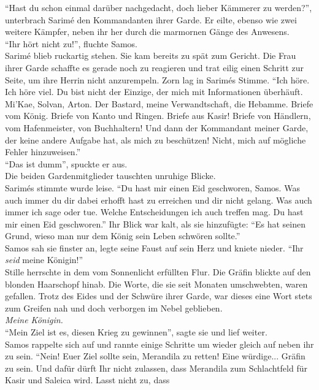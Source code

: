 ``Hast du schon einmal darüber nachgedacht, doch lieber Kämmerer zu werden?'', unterbrach Sarimé 
den Kommandanten ihrer Garde. Er eilte, ebenso wie zwei weitere Kämpfer, neben ihr her durch die 
marmornen Gänge des Anwesens.\\
``Ihr hört nicht zu!'', fluchte Samos.\\
Sarimé blieb ruckartig stehen. Sie kam bereits zu spät zum Gericht. Die Frau ihrer Garde schaffte 
es gerade noch zu reagieren und trat eilig einen Schritt zur Seite, um ihre Herrin nicht anzurempeln. 
Zorn lag in Sarimés Stimme. ``Ich höre. Ich höre viel. Du bist nicht der Einzige, der mich mit 
Informationen überhäuft. Mi'Kae, Solvan, Arton. Der Bastard, meine Verwandtschaft, die Hebamme. 
Briefe vom König. Briefe von Kanto und Ringen. Briefe aus Kasir! Briefe von Händlern, vom 
Hafenmeister, von Buchhaltern! Und dann der Kommandant meiner Garde, der keine andere Aufgabe hat, 
als mich zu beschützen! Nicht, mich auf mögliche Fehler hinzuweisen.''\\
``Das ist dumm'', spuckte er aus.\\
Die beiden Gardenmitglieder tauschten unruhige Blicke.\\
Sarimés stimmte wurde leise. ``Du hast mir einen Eid geschworen, Samos. Was auch immer du dir dabei 
erhofft hast zu erreichen und dir nicht gelang. Was auch immer ich sage oder tue. Welche 
Entscheidungen ich auch treffen mag. Du hast mir einen Eid geschworen.'' Ihr Blick war kalt, als 
sie hinzufügte: ``Es hat seinen Grund, wieso man nur dem König sein Leben schwören sollte.''\\
Samos sah sie finster an, legte seine Faust auf sein Herz und kniete nieder. ``Ihr 
\textit{seid} meine Königin!''\\
Stille herrschte in dem vom Sonnenlicht erfüllten Flur. Die Gräfin blickte auf den blonden Haarschopf
hinab. Die Worte, die sie seit Monaten umschwebten, waren gefallen. Trotz des Eides und der Schwüre 
ihrer Garde, war dieses eine Wort stets zum Greifen nah und doch verborgen im Nebel geblieben.\\
\textit{Meine Königin.}\\
``Mein Ziel ist es, diesen Krieg zu gewinnen'', sagte sie und lief weiter.\\
Samos rappelte sich auf und rannte einige Schritte um wieder gleich auf neben ihr zu sein. ``Nein! 
Euer Ziel sollte sein, Merandila zu retten! Eine würdige... Gräfin zu sein. Und dafür dürft Ihr 
nicht zulassen, dass Merandila zum Schlachtfeld für Kasir und Saleica wird. Lasst nicht zu, dass 
